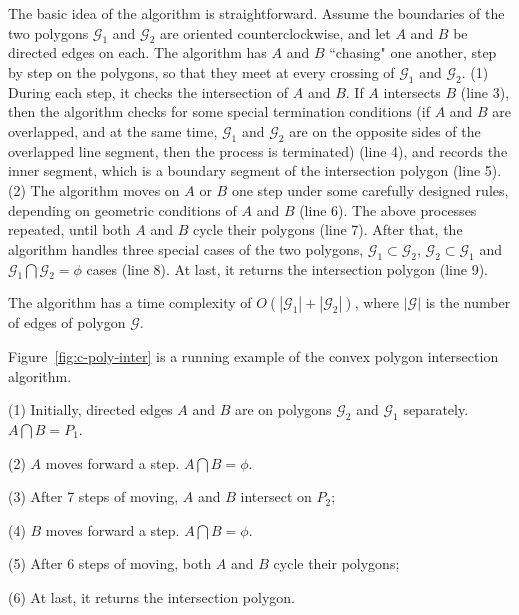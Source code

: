 The basic idea of the algorithm is straightforward. Assume the boundaries of the two polygons $\mathcal{G}_1$ and $\mathcal{G}_2$ are oriented counterclockwise, and let $A$ and $B$ be directed edges on each. The algorithm has $A$ and $B$ ``chasing" one another, step by step on the polygons, so that they meet at every crossing of $\mathcal{G}_1$ and $\mathcal{G}_2$.
%
(1) During each step, it checks the intersection of $A$ and $B$. If $A$ intersects $B$ (line 3), then the algorithm checks for some special termination conditions (\eg if $A$ and $B$ are overlapped, and at the same time, $\mathcal{G}_1$ and $\mathcal{G}_2$ are on the opposite sides of the overlapped line segment, then the process is terminated) (line 4), and records the inner segment, which is a boundary segment of the intersection polygon (line 5).
%
(2) The algorithm moves on $A$ or $B$ one step under some carefully designed rules, depending on geometric conditions of $A$ and $B$ (line 6).
The above processes repeated, until both $A$ and $B$ cycle their polygons (line 7).
%
After that, the algorithm handles three special cases of the two polygons, \ie $\mathcal{G}_1 \subset \mathcal{G}_2$, $\mathcal{G}_2 \subset \mathcal{G}_1$ and $\mathcal{G}_1 \bigcap \mathcal{G}_2 = \phi$ cases (line 8).
%
At last, it returns the intersection polygon (line 9).

The algorithm has a time complexity of $O(|\mathcal{G}_1| + |\mathcal{G}_2|)$, where $|\mathcal{G}|$ is the number of edges of polygon $\mathcal{G}$.





\begin{example}
Figure~\ref{fig:c-poly-inter} is a running example of the convex polygon intersection algorithm.

\ni (1) Initially, directed edges $A$ and $B$ are on polygons $\mathcal{G}_2$ and $\mathcal{G}_1$ separately. $A \bigcap B = P_1$.

\ni (2) $A$ moves forward a step. $A \bigcap B = \phi$.

\ni (3) After 7 steps of moving, $A$ and $B$ intersect on $P_2$;

\ni (4) $B$ moves forward a step. $A \bigcap B = \phi$.

\ni (5) After 6 steps of moving, both $A$ and $B$ cycle their polygons;

\ni (6) At last, it returns the intersection polygon.
\end{example}


